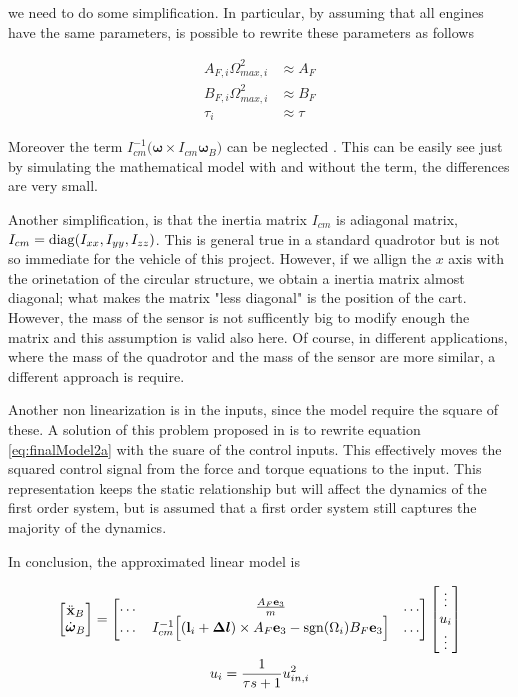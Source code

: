 \noindent we need to do some simplification. In particular, by assuming that all engines have the same parameters, is possible to rewrite these parameters as follows

\begin{align}
	A_{F,i}\Omega_{max,i}^2 &\approx A_F \\
	B_{F,i}\Omega_{max,i}^2 &\approx B_F \\
	\tau_i &\approx \tau
	\label{eq:simplification}
\end{align}

\noindent Moreover the term $I_{cm}^{-1}\bigl(\boldsymbol{\omega}\times I_{cm}\boldsymbol{\omega}_B\bigl)$ can be neglected \cite{modelIdentification}. This can be easily see just by simulating the mathematical model with and without the term, the differences are very small.

\noindent Another simplification, is that the inertia matrix $I_{cm}$ is adiagonal matrix, $I_{cm} = \operatorname*{diag}(\allowbreak I_{xx}, I_{yy}, I_{zz})$. This is general true in a standard quadrotor but is not so immediate for the vehicle of this project. However, if we allign the $x$ axis with the orinetation of the circular structure, we obtain a inertia matrix almost diagonal; what makes the matrix "less diagonal" is the position of the cart. However, the mass of the sensor is not sufficently big to modify enough the matrix and this assumption is valid also here. Of course, in different applications, where the mass of the quadrotor and the mass of the sensor are more similar, a different approach is require.

\noindent Another non linearization is in the inputs, since the model require the square of these. A solution of this problem proposed in \cite{modelIdentification} is to rewrite equation \eqref{eq:finalModel2a} with the suare of the control inputs. This effectively moves the squared control signal from the force and torque equations to the input. This representation keeps the static relationship but will affect the dynamics of the first order system, but is assumed that a first order system still captures the majority of the dynamics.

\noindent In conclusion, the approximated linear model is

\begin{gather}
	\begin{bmatrix}
		\ddot{\mathbf{x}}_B \\
		\dot{\boldsymbol{\omega}}_B
	\end{bmatrix}
	=
	\begin{bmatrix}
		\dots & \frac{A_F \mathbf{e}_3}{m} & \dots \\
		\dots & I_{cm}^{-1}\Big[(\mathbf{l}_i+\boldsymbol{\Delta l})\times A_F\mathbf{e}_3-\operatorname*{sgn}(\Omega_i)B_F\mathbf{e}_3\Big] & \dots 
	\end{bmatrix}
	\begin{bmatrix}
		\vdots \\
		u_i \\
		\vdots
	\end{bmatrix} 
	\label{eq:linearModel1}\\
	u_i = \frac{1}{\tau s+1}u_{in,i}^2
	\label{eq:linearModel2}
\end{gather}


